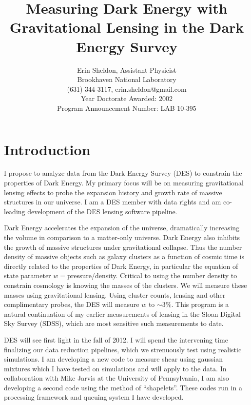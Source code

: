 \documentclass[12pt]{article}
\begin{document}
\title{Measuring Dark Energy with Gravitational Lensing in the Dark Energy Survey}
\author{Erin Sheldon, Assistant Physicist\\
Brookhaven National Laboratory\\
(631) 344-3117, erin.sheldon@gmail.com\\
Year Doctorate Awarded: 2002\\
Program Announcement Number: LAB 10-395}

\date{}
\maketitle

\section{Introduction}
I propose to analyze data from the Dark Energy Survey (DES) to constrain the
properties of Dark Energy.  My primary focus will be on measuring gravitational
lensing effects to probe the expansion history and growth rate of massive
structures in our universe.  I am a DES member with data rights and am co-leading 
development of the DES lensing software pipeline.

Dark Energy accelerates the expansion of the universe, dramatically increasing
the volume in comparison to a matter-only universe.  Dark Energy also inhibits
the growth of massive structures under gravitational collapse.  Thus the number
density of massive objects such as galaxy clusters as a function of cosmic time
is directly related to the properties of Dark Energy, in particular the
equation of state parameter $w=$pressure/density.  Critical to using the number
density to constrain cosmology is knowing the masses of the clusters. We will
measure these masses using gravitational lensing.  Using cluster counts,
lensing and other complimentary probes, the DES will measure $w$ to $\sim$3\%.
This program is a natural continuation of my earlier measurements of lensing in
the Sloan Digital Sky Survey (SDSS), which are most sensitive such measurements
to date.

DES will see first light in the fall of 2012.  I will spend the intervening
time finalizing our data reduction pipelines, which we strenuously test using
realistic simulations.  I am developing a new code to measure shear using
gaussian mixtures which I have tested on simulations and will apply to the
data.  In collaboration with Mike Jarvis at the University of Pennsylvania, I
am also developing a second code using the method of ``shapelets''.  These
codes run in a processing framework and queuing system I have developed. 
\end{document}
